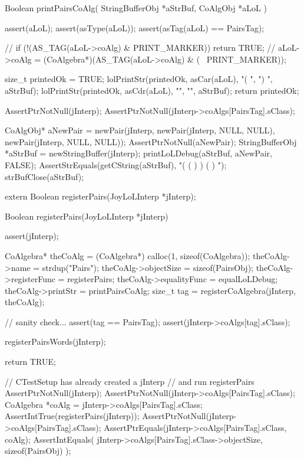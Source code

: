 \startCCode
Boolean printPairsCoAlg(
  StringBufferObj *aStrBuf,
  CoAlgObj        *aLoL
) {
  assert(aLoL);
  assert(asType(aLoL));
  assert(asTag(aLoL) == PairsTag);

//  if (!(AS_TAG(aLoL->coAlg) & PRINT_MARKER)) return TRUE;
//  aLoL->coAlg = (CoAlgebra*)(AS_TAG(aLoL->coAlg) & (~ PRINT_MARKER));

  size_t printedOk = TRUE;
  lolPrintStr(printedOk, asCar(aLoL), "( ", ") ", aStrBuf);
  lolPrintStr(printedOk, asCdr(aLoL), "",   "",   aStrBuf);
  return printedOk;
}
\stopCCode


\startCTest
  AssertPtrNotNull(jInterp);
  AssertPtrNotNull(jInterp->coAlgs[PairsTag].sClass);

  CoAlgObj* aNewPair = newPair(jInterp,
                               newPair(jInterp, NULL, NULL),
                               newPair(jInterp, NULL, NULL));
  AssertPtrNotNull(aNewPair);
  StringBufferObj *aStrBuf = newStringBuffer(jInterp);
  printLoLDebug(aStrBuf, aNewPair, FALSE);
  AssertStrEquals(getCString(aStrBuf), "( ( ) ) ( ) ");
  strBufClose(aStrBuf);
\stopCTest
\stopTestCase
\stopTestSuite

\startTestSuite[registerPairs]

\startCHeader
extern Boolean registerPairs(JoyLoLInterp *jInterp);
\stopCHeader
{}

\startCCode
Boolean registerPairs(JoyLoLInterp *jInterp) {
  assert(jInterp);
  
  CoAlgebra* theCoAlg    = (CoAlgebra*) calloc(1, sizeof(CoAlgebra));
  theCoAlg->name         = strdup("Pairs");
  theCoAlg->objectSize   = sizeof(PairsObj);
  theCoAlg->registerFunc = registerPairs;
  theCoAlg->equalityFunc = equalLoLDebug;
  theCoAlg->printStr     = printPairsCoAlg;
  size_t tag = registerCoAlgebra(jInterp, theCoAlg);
  
  // sanity check...
  assert(tag == PairsTag);
  assert(jInterp->coAlgs[tag].sClass);
    
  registerPairsWords(jInterp);
  
  return TRUE;
}
\stopCCode


\startCTest
  // CTestSetup has already created a jInterp
  // and run registerPairs
  AssertPtrNotNull(jInterp);
  AssertPtrNotNull(jInterp->coAlgs[PairsTag].sClass);
  CoAlgebra *coAlg = jInterp->coAlgs[PairsTag].sClass;
  AssertIntTrue(registerPairs(jInterp));
  AssertPtrNotNull(jInterp->coAlgs[PairsTag].sClass);
  AssertPtrEquals(jInterp->coAlgs[PairsTag].sClass, coAlg);
  AssertIntEquals(
    jInterp->coAlgs[PairsTag].sClass->objectSize,
    sizeof(PairsObj)
  );
\stopCTest
\stopTestCase
\stopTestSuite

